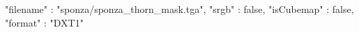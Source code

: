 { 
	"filename" : "sponza/sponza_thorn_mask.tga", 
	"srgb" : false,
	"isCubemap" : false,
	"format" : "DXT1"
}